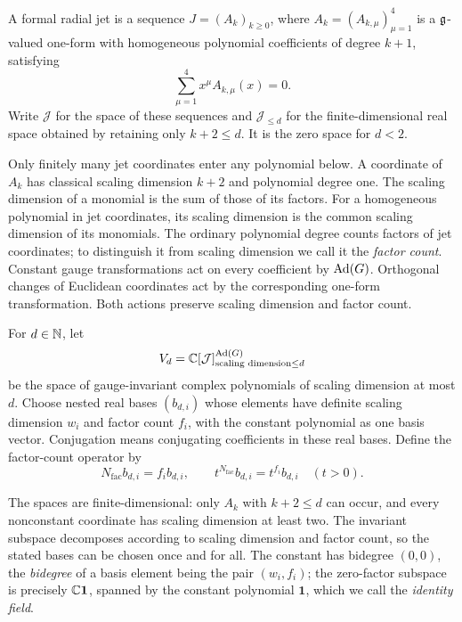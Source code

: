 \begin{definition}
\label{ch02:radial-jets}
A formal radial jet is a sequence $J=(A_k)_{k\ge0}$, where
$A_k=(A_{k,\mu})_{\mu=1}^4$ is a $\mathfrak g$-valued one-form with homogeneous
polynomial coefficients of degree $k+1$, satisfying
\[
 \sum_{\mu=1}^4x^\mu A_{k,\mu}(x)=0.
\]
Write $\mathcal J$ for the space of these sequences and
$\mathcal J_{\le d}$ for the finite-dimensional real space obtained by
retaining only $k+2\le d$. It is the zero space for $d<2$.
\end{definition}
Only finitely many jet coordinates enter any polynomial below. A coordinate
of $A_k$ has classical scaling dimension $k+2$ and polynomial degree one.
The scaling dimension of a monomial is the sum of those of its factors.
For a homogeneous polynomial in jet coordinates, its scaling
dimension is the common scaling dimension of its monomials.
The ordinary polynomial degree counts factors of jet coordinates; to
distinguish it from scaling dimension we call it the \emph{factor count}.
Constant gauge transformations act on every coefficient by $\operatorname{Ad}(G)$.
Orthogonal changes of Euclidean coordinates act by the corresponding
one-form transformation. Both actions preserve scaling dimension and factor count.

\begin{definition}
\label{ch02:labels}
For $d\in\mathbb N$, let
\begin{equation}
 V_d=\mathbb C[\mathcal J]^{\operatorname{Ad}(G)}_{\text{scaling dimension}\le d}
 \label{ch02:label-space}
\end{equation}
be the space of gauge-invariant complex polynomials of scaling dimension
at most $d$. Choose nested real bases $(b_{d,i})$ whose elements have definite scaling dimension
$w_i$ and factor count $f_i$, with the constant polynomial as one basis
vector. Conjugation means conjugating coefficients in these real bases.
Define the factor-count operator by
\begin{equation}
 N_{\mathrm{fac}}b_{d,i}=f_i b_{d,i},\qquad
 t^{N_{\mathrm{fac}}}b_{d,i}=t^{f_i}b_{d,i}\quad(t>0).
 \label{ch02:factor-scaling}
\end{equation}
\end{definition}
The spaces are finite-dimensional: only $A_k$ with $k+2\le d$ can occur,
and every nonconstant coordinate has scaling dimension at least two. The invariant
subspace decomposes according to scaling dimension and factor count, so the stated bases can be chosen once and for all. The
constant has bidegree $(0,0)$, the \emph{bidegree} of a basis element being the pair $(w_i,f_i)$; the zero-factor subspace is precisely
$\mathbb C\mathbf1$, spanned by the constant polynomial $\mathbf1$, which we call the \emph{identity field}.

